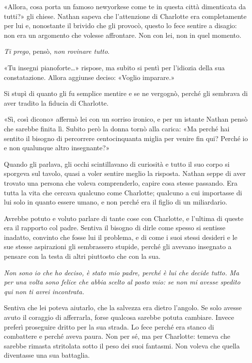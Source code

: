 «Allora, cosa porta un famoso newyorkese come te in questa città dimenticata da tutti?» gli chiese.
Nathan sapeva che l'attenzione di Charlotte era completamente per lui e, nonostante il brivido che
gli provocò, questo lo fece sentire a disagio: non era un argomento che volesse affrontare. Non con
lei, non in quel momento.

\emph{Ti prego}, pensò, \emph{non rovinare tutto}.

«Tu insegni pianoforte\dots» rispose, ma subito si pentì per l'idiozia della sua constatazione.
Allora aggiunse deciso: «Voglio imparare.»

Si stupì di quanto gli fu semplice mentire e se ne vergognò, perché gli sembrava di aver tradito la
fiducia di Charlotte.

«Sì, così dicono» affermò lei con un sorriso ironico, e per un istante Nathan pensò che sarebbe
finita lì. Subito però la donna tornò alla carica: «Ma perché hai sentito il bisogno di percorrere
centocinquanta miglia per venire fin qui? Perché io e non qualunque altro insegnante?»

Quando gli parlava, gli occhi scintillavano di curiosità e tutto il suo corpo si sporgeva sul
tavolo, quasi a voler sentire meglio la risposta. Nathan seppe di aver trovato una persona che
voleva comprenderlo, capire cosa stesse passando. Era tutta la vita che cercava qualcuno come
Charlotte; qualcuno a cui importasse di lui solo in quanto essere umano, e non perché era il figlio
di un miliardario.

Avrebbe potuto e voluto parlare di tante cose con Charlotte, e l'ultima di queste era il rapporto
col padre. Sentiva il bisogno di dirle come spesso si sentisse inadatto, convinto che fosse lui il
problema, e di come i suoi stessi desideri e le sue stesse aspirazioni gli sembrassero stupide,
perché gli avevano insegnato a pensare con la testa di altri piuttosto che con la sua.

\emph{Non sono io che ho deciso, è stato mio padre, perché è lui che decide tutto. Ma per una volta
sono felice che abbia scelto al posto mio: se non mi avesse spedito qui non ti avrei incontrata.}

Sentiva che lei poteva aiutarlo, che la salvezza era dietro l'angolo. Se solo avesse avuto il
coraggio di afferrarla, forse qualcosa sarebbe potuta cambiare. Invece preferì proseguire dritto per
la sua strada. Lo fece perché era stanco di combattere e perché aveva paura. Non per sé, ma per
Charlotte: temeva che sarebbe rimasta stritolata sotto il peso dei suoi fantasmi. Non voleva che
quella diventasse una sua battaglia.

